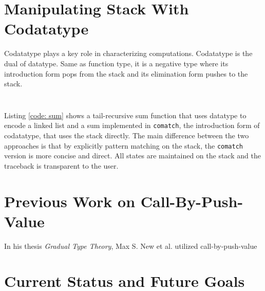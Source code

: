 \documentclass[acmsmall,nonacm]{acmart}
\begin{document}
\section{Manipulating Stack With Codatatype}

Codatatype plays a key role in characterizing computations. Codatatype is the dual of datatype. Same as function type, it is a negative type where its introduction form pops from the stack and its elimination form pushes to the stack.
\begin{listing}[ht]
    \begin{multicols}{2}
        \inputminted{Haskell}{examples/sumfn.zydeco}
        \vfill
        \inputminted{Haskell}{examples/sumco.zydeco}
        \vfill
    \end{multicols}
    \label{code: sum}
\end{listing}

Listing \ref{code: sum} shows a tail-recursive sum function that uses datatype to encode a linked list and a sum implemented in \texttt{comatch}, the introduction form of codatatype, that uses the stack directly. The main difference between the two approaches is that by explicitly pattern matching on the stack, the \texttt{comatch} version is more concise and direct. All states are maintained on the stack and the traceback is transparent to the user.


\section{Previous Work on Call-By-Push-Value}

In his thesis \textit{Gradual Type Theory}, Max S. New et al. utilized call-by-push-value 

\section{Current Status and Future Goals}
\end{document}
